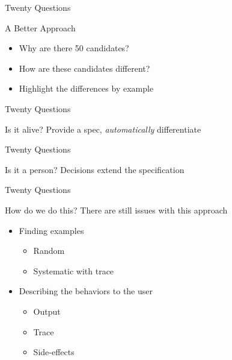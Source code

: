 \begin{frame}{Twenty Questions}
  \begin{block}{A Better Approach}

    \begin{itemize}
      \item Why are there 50 candidates?
      \item How are these candidates different?
      \item Highlight the differences by example
    \end{itemize}
  \end{block}
\end{frame}


\begin{frame}{Twenty Questions}
  \begin{block}{Is it alive?}
    Provide a spec, \textit{automatically} differentiate

    \begin{example}
      
    \end{example}
  \end{block}
\end{frame}

\begin{frame}{Twenty Questions}
  \begin{block}{Is it a person?}
    Decisions extend the specification

    \begin{example}
      
    \end{example}
  \end{block}
\end{frame}

\begin{frame}{Twenty Questions}
  \begin{block}{How do we do this?}
    There are still issues with this approach

    \begin{itemize}
      \item Finding examples
        \begin{itemize}
          \item Random
          \item Systematic with trace
        \end{itemize}
      \item Describing the behaviors to the user
        \begin{itemize}
          \item Output
          \item Trace
          \item Side-effects
        \end{itemize}
    \end{itemize}
  \end{block}
\end{frame}